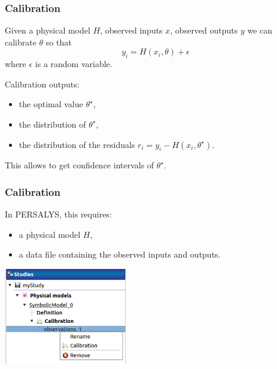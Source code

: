 \documentclass{beamer}
\begin{document}

\begin{frame}
\frametitle{Calibration}

Given a physical model $H$, observed inputs $x$, 
observed outputs $y$ we can calibrate $\theta$ so that 
$$
y_i = H(x_i, \theta) + \epsilon
$$
where $\epsilon$ is a random variable.

Calibration outputs:
\begin{itemize}
\item the optimal value $\theta^\star$,
\item the distribution of $\theta^\star$,
\item the distribution of the residuals $r_i = y_i - H(x_i, \theta^\star)$.
\end{itemize}

This allows to get confidence intervals of $\theta^\star$.

\end{frame}


\begin{frame}
\frametitle{Calibration}

In PERSALYS, this requires:
\begin{itemize}
\item a physical model $H$, 
\item a data file containing the observed inputs and outputs.
\end{itemize}

\begin{center}
\includegraphics[width=0.4\textwidth]{figures/observations_contextMenu.png}
\end{center}

\end{frame}

\end{document}
